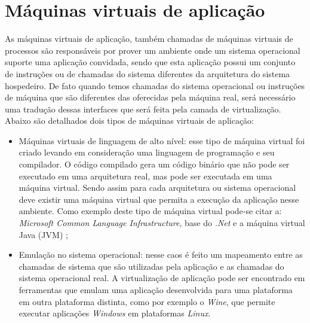 \section{Máquinas virtuais de aplicação}
\label{section:virtaplicacao}

As máquinas virtuais de aplicação, também chamadas de máquinas virtuais de processos são responsáveis por prover um ambiente
onde um sistema operacional suporte uma aplicação convidada, sendo que esta aplicação possui um conjunto de instruções ou de chamadas
do sistema diferentes da arquitetura do sistema hospedeiro. De fato quando temos chamadas do sistema operacional ou instruções de máquina 
que são diferentes das oferecidas pela máquina real, será necessário uma tradução dessas interfaces que será feita pela camada  de 
virtualização. Abaixo são detalhados dois tipos de máquinas virtuais de aplicação:

\begin{itemize}
 \item Máquinas virtuais de linguagem de alto nível: esse tipo de máquina virtual foi criado levando em consideração uma linguagem de 
 programação e seu compilador. O código compilado gera um código binário que não pode ser executado em uma arquitetura real, mas pode
 ser executada em uma máquina virtual. Sendo assim para cada arquitetura ou sistema operacional deve existir uma máquina virtual que
 permita a execução da aplicação nesse ambiente. Como exemplo deste tipo de máquina virtual pode-se citar a: \textit{Microsoft Common 
 Language Infrastructure}, base do \textit{.Net} e a máquina virtual Java (\ac{JVM}) \cite{carissimi2008};
 \item Emulação no sistema operacional: nesse caos é feito um mapeamento entre as chamadas de sistema que são utilizadas pela aplicação 
 e as chamadas do sistema operacional real. A virtualização de aplicação pode ser encontrado em ferramentas que emulam uma aplicação 
 desenvolvida para uma plataforma em outra plataforma distinta, como por exemplo o \textit{Wine}, que permite executar aplicações 
 \textit{Windows} em plataformas \textit{Linux}.
\end{itemize}


